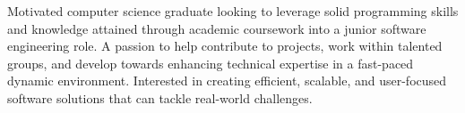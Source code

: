 %
%
%
\par{
    Motivated computer science graduate looking to leverage solid programming skills and knowledge attained through academic coursework into a junior software engineering role. A passion to help contribute to projects, work within talented groups, and develop towards enhancing technical expertise in a fast-paced dynamic environment. Interested in creating efficient, scalable, and user-focused software solutions that can tackle real-world challenges. 
}